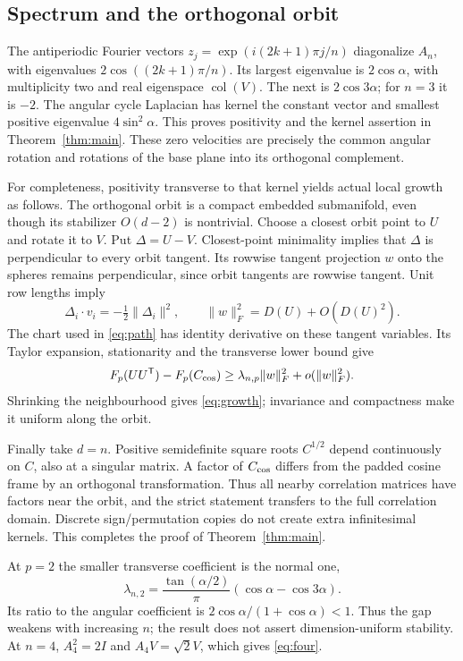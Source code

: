 \documentclass[11pt,a4paper]{article}
\theoremstyle{remark}\newtheorem{remark}[theorem]{Remark}
\begin{document}
\subsection{Spectrum and the orthogonal orbit}
The antiperiodic Fourier vectors $z_j=\exp(i(2k+1)\pi j/n)$ diagonalize $A_n$, with eigenvalues $2\cos((2k+1)\pi/n)$. Its largest eigenvalue is $2\cos\alpha$, with multiplicity two and real eigenspace $\operatorname{col}(V)$. The next is $2\cos3\alpha$; for $n=3$ it is $-2$. The angular cycle Laplacian has kernel the constant vector and smallest positive eigenvalue $4\sin^2\alpha$. This proves positivity and the kernel assertion in Theorem~\ref{thm:main}. These zero velocities are precisely the common angular rotation and rotations of the base plane into its orthogonal complement.

For completeness, positivity transverse to that kernel yields actual local growth as follows. The orthogonal orbit is a compact embedded submanifold, even though its stabilizer $O(d-2)$ is nontrivial. Choose a closest orbit point to $U$ and rotate it to $V$. Put $\Delta=U-V$. Closest-point minimality implies that $\Delta$ is perpendicular to every orbit tangent. Its rowwise tangent projection $w$ onto the spheres remains perpendicular, since orbit tangents are rowwise tangent. Unit row lengths imply
\[
 \Delta_i\cdot v_i=-\tfrac12\|\Delta_i\|^2,\qquad
 \|w\|_F^2=D(U)+O(D(U)^2).
\]
The chart used in \eqref{eq:path} has identity derivative on these tangent variables. Its Taylor expansion, stationarity and the transverse lower bound give
\[
 F_p(UU^{\mathsf T})-F_p(C_{\rm cos})
 \ge\lambda_{n,p}\|w\|_F^2+o(\|w\|_F^2).
\]
Shrinking the neighbourhood gives \eqref{eq:growth}; invariance and compactness make it uniform along the orbit.

Finally take $d=n$. Positive semidefinite square roots $C^{1/2}$ depend continuously on $C$, also at a singular matrix. A factor of $C_{\rm cos}$ differs from the padded cosine frame by an orthogonal transformation. Thus all nearby correlation matrices have factors near the orbit, and the strict statement transfers to the full correlation domain. Discrete sign/permutation copies do not create extra infinitesimal kernels. This completes the proof of Theorem~\ref{thm:main}.

At $p=2$ the smaller transverse coefficient is the normal one,
\[
 \lambda_{n,2}=\frac{\tan(\alpha/2)}{\pi}(\cos\alpha-\cos3\alpha).
\]
Its ratio to the angular coefficient is $2\cos\alpha/(1+\cos\alpha)<1$. Thus the gap weakens with increasing $n$; the result does not assert dimension-uniform stability. At $n=4$, $A_4^2=2I$ and $A_4V=\sqrt2V$, which gives \eqref{eq:four}.
\end{document}

